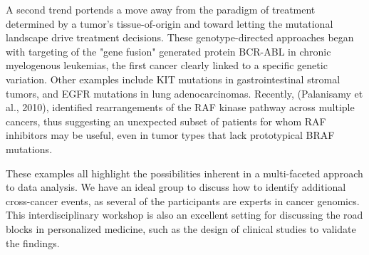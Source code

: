 \documentclass[12pt]{amsart}
\begin{document}
\begin{itemize}
  A second trend portends a move away from the paradigm of treatment
  determined by a tumor's tissue-of-origin and toward letting the
  mutational landscape drive treatment decisions. These
  genotype-directed approaches began with targeting of the "gene
  fusion" generated protein BCR-ABL in chronic myelogenous leukemias,
  the first cancer clearly linked to a specific genetic
  variation. Other examples include KIT mutations in gastrointestinal
  stromal tumors, and EGFR mutations in lung adenocarcinomas.
  Recently, (Palanisamy et al., 2010), identified rearrangements of
  the RAF kinase pathway across multiple cancers, thus suggesting an
  unexpected subset of patients for whom RAF inhibitors may be useful,
  even in tumor types that lack prototypical BRAF mutations.

  These examples all highlight the possibilities inherent in a
  multi-faceted approach to data analysis.  We have an ideal group to
  discuss how to identify additional cross-cancer events, as several
  of the participants are experts in cancer genomics. This
  interdisciplinary workshop is also an excellent setting for
  discussing the road blocks in personalized medicine, such as the
  design of clinical studies to validate the findings.
\end{itemize}
\end{document}
